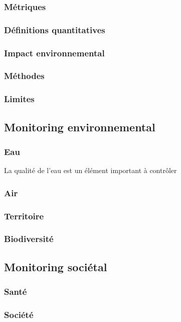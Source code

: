 \documentclass[a4paper,11pt,titlepage]{article}
\begin{document}
			\subsubsection{Métriques}
			\subsubsection{Définitions quantitatives}
			\subsubsection{Impact environnemental}
			\subsubsection{Méthodes}			
			\subsubsection{Limites}
			
		\subsection{Monitoring environnemental}
			\subsubsection{Eau}
				La qualité de l'eau est un élément important à contrôler
			\subsubsection{Air}
			\subsubsection{Territoire}
			\subsubsection{Biodiversité}
		
		\subsection{Monitoring sociétal}
			\subsubsection{Santé}
			\subsubsection{Société}
			
\end{document}
